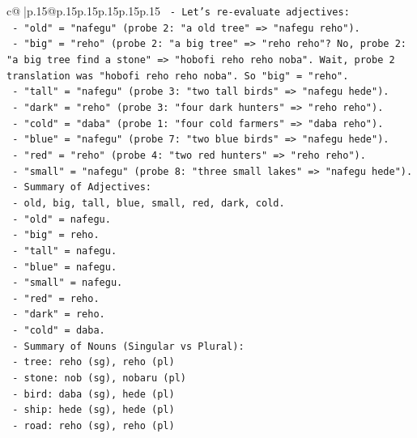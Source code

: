 \documentclass{article}
\begin{document}
{\begin{supertabular}{c@{$\;$}|p{.15\linewidth}@{}p{.15\linewidth}p{.15\linewidth}p{.15\linewidth}p{.15\linewidth}p{.15\linewidth}}
{{{\texttt{    {-} Let's re{-}evaluate adjectives:} \\
\texttt{        {-} "old" = "nafegu" (probe 2: "a old tree" => "nafegu reho").} \\
\texttt{        {-} "big" = "reho" (probe 2: "a big tree" => "reho reho"? No, probe 2: "a big tree find a stone" => "hobofi reho reho noba". Wait, probe 2 translation was "hobofi reho reho noba". So "big" = "reho".} \\
\texttt{        {-} "tall" = "nafegu" (probe 3: "two tall birds" => "nafegu hede").} \\
\texttt{        {-} "dark" = "reho" (probe 3: "four dark hunters" => "reho reho").} \\
\texttt{        {-} "cold" = "daba" (probe 1: "four cold farmers" => "daba reho").} \\
\texttt{        {-} "blue" = "nafegu" (probe 7: "two blue birds" => "nafegu hede").} \\
\texttt{        {-} "red" = "reho" (probe 4: "two red hunters" => "reho reho").} \\
\texttt{        {-} "small" = "nafegu" (probe 8: "three small lakes" => "nafegu hede").} \\
\texttt{    {-} Summary of Adjectives:} \\
\texttt{        {-} old, big, tall, blue, small, red, dark, cold.} \\
\texttt{        {-} "old" = nafegu.} \\
\texttt{        {-} "big" = reho.} \\
\texttt{        {-} "tall" = nafegu.} \\
\texttt{        {-} "blue" = nafegu.} \\
\texttt{        {-} "small" = nafegu.} \\
\texttt{        {-} "red" = reho.} \\
\texttt{        {-} "dark" = reho.} \\
\texttt{        {-} "cold" = daba.} \\
\texttt{    {-} Summary of Nouns (Singular vs Plural):} \\
\texttt{        {-} tree: reho (sg), reho (pl)} \\
\texttt{        {-} stone: nob (sg), nobaru (pl)} \\
\texttt{        {-} bird: daba (sg), hede (pl)} \\
\texttt{        {-} ship: hede (sg), hede (pl)} \\
\texttt{        {-} road: reho (sg), reho (pl)} \\
}}}
\end{supertabular}}
\end{document}
